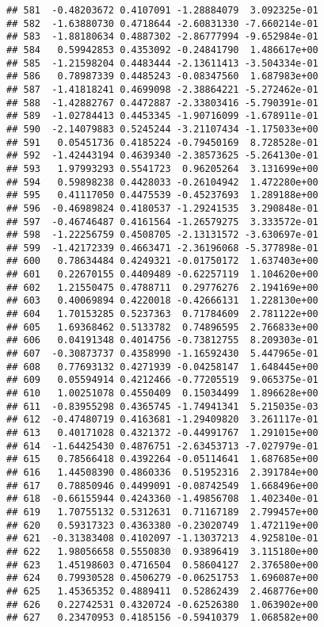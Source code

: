 \documentclass[
]{article}
\begin{document}
\begin{verbatim}
## 581  -0.48203672 0.4107091 -1.28884079  3.092325e-01
## 582  -1.63880730 0.4718644 -2.60831330 -7.660214e-01
## 583  -1.88180634 0.4887302 -2.86777994 -9.652984e-01
## 584   0.59942853 0.4353092 -0.24841790  1.486617e+00
## 585  -1.21598204 0.4483444 -2.13611413 -3.504334e-01
## 586   0.78987339 0.4485243 -0.08347560  1.687983e+00
## 587  -1.41818241 0.4699098 -2.38864221 -5.272462e-01
## 588  -1.42882767 0.4472887 -2.33803416 -5.790391e-01
## 589  -1.02784413 0.4453345 -1.90716099 -1.678911e-01
## 590  -2.14079883 0.5245244 -3.21107434 -1.175033e+00
## 591   0.05451736 0.4185224 -0.79450169  8.728528e-01
## 592  -1.42443194 0.4639340 -2.38573625 -5.264130e-01
## 593   1.97993293 0.5541723  0.96205264  3.131699e+00
## 594   0.59898238 0.4428033 -0.26104942  1.472280e+00
## 595   0.41117050 0.4475539 -0.45237693  1.289188e+00
## 596  -0.46989824 0.4180537 -1.29241535  3.290848e-01
## 597  -0.46746487 0.4161564 -1.26579275  3.333572e-01
## 598  -1.22256759 0.4508705 -2.13131572 -3.630697e-01
## 599  -1.42172339 0.4663471 -2.36196068 -5.377898e-01
## 600   0.78634484 0.4249321 -0.01750172  1.637403e+00
## 601   0.22670155 0.4409489 -0.62257119  1.104620e+00
## 602   1.21550475 0.4788711  0.29776276  2.194169e+00
## 603   0.40069894 0.4220018 -0.42666131  1.228130e+00
## 604   1.70153285 0.5237363  0.71784609  2.781122e+00
## 605   1.69368462 0.5133782  0.74896595  2.766833e+00
## 606   0.04191348 0.4014756 -0.73812755  8.209303e-01
## 607  -0.30873737 0.4358990 -1.16592430  5.447965e-01
## 608   0.77693132 0.4271939 -0.04258147  1.648445e+00
## 609   0.05594914 0.4212466 -0.77205519  9.065375e-01
## 610   1.00251078 0.4550409  0.15034499  1.896628e+00
## 611  -0.83955298 0.4365745 -1.74941341  5.215035e-03
## 612  -0.47480719 0.4163681 -1.29409820  3.261117e-01
## 613   0.40171028 0.4321372 -0.44991767  1.291015e+00
## 614  -1.64425430 0.4876751 -2.63453713 -7.027979e-01
## 615   0.78566418 0.4392264 -0.05114641  1.687685e+00
## 616   1.44508390 0.4860336  0.51952316  2.391784e+00
## 617   0.78850946 0.4499091 -0.08742549  1.668496e+00
## 618  -0.66155944 0.4243360 -1.49856708  1.402340e-01
## 619   1.70755132 0.5312631  0.71167189  2.799457e+00
## 620   0.59317323 0.4363380 -0.23020749  1.472119e+00
## 621  -0.31383408 0.4102097 -1.13037213  4.925810e-01
## 622   1.98056658 0.5550830  0.93896419  3.115180e+00
## 623   1.45198603 0.4716504  0.58604127  2.376580e+00
## 624   0.79930528 0.4506279 -0.06251753  1.696087e+00
## 625   1.45365352 0.4889411  0.52862439  2.468776e+00
## 626   0.22742531 0.4320724 -0.62526380  1.063902e+00
## 627   0.23470953 0.4185156 -0.59410379  1.068582e+00

\end{verbatim}
\end{document}
